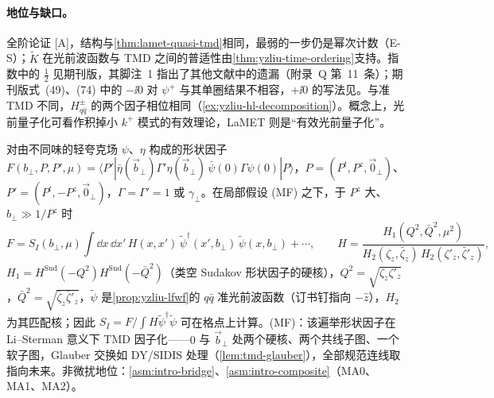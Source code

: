 \paragraph{地位与缺口。}全阶论证 [A]，结构与\cref{thm:lamet-quasi-tmd}相同，最弱的一步仍是幂次计数（E-S）；$\tilde K$ 在光前波函数与 TMD 之间的普适性由\cref{thm:yzliu-time-ordering}支持。指数中的 $\frac12$ 见期刊版\cite[式~(49)、(51)、(74)]{Ji:2021znw}，其脚注~1 指出了其他文献中的遗漏（附录~Q 第~11~条）；期刊版式~(49)、(74) 中的 $-\ii0$ 对 $\psi^+$ 与其单圈结果不相容，$+\ii0$ 的写法见\cite[式~(4.4)]{Liu:2023onm}。与准 TMD 不同，$H^\pm_{q\bar q}$ 的两个因子相位相同（\cref{ex:yzliu-hl-decomposition}）。概念上，光前量子化可看作积掉小 $k^+$ 模式的有效理论，LaMET 则是“有效光前量子化”\cite[第~II.C~节]{Ji:2021znw}。

\begin{proposition}\label{prop:yzliu-meson-ff}
对由不同味的轻夸克场 $\psi$、$\eta$ 构成的形状因子 $F(b_\perp,P,P',\mu)=\langle P'|\bar\eta(\vec b_\perp)\Gamma'\eta(\vec b_\perp)\,\bar\psi(0)\Gamma\psi(0)|P\rangle$，$P=(P^t,P^z,\vec0_\perp)$、$P'=(P^t,-P^z,\vec0_\perp)$，$\Gamma=\Gamma'=1$ 或 $\gamma_\perp$。在局部假设 (MF) 之下，于 $P^z$ 大、$b_\perp\gg1/P^z$ 时 %
\begin{equation}\label{eq:yzliu-meson-ff}
F=S_I(b_\perp,\mu)\int\dd x\,\dd x'\,H(x,x')\,\tilde\psi^\dagger(x',b_\perp)\,\tilde\psi(x,b_\perp)+\cdots,\qquad H=\frac{H_1(Q^2,\bar Q^2,\mu^2)}{H_2(\zeta_z,\bar\zeta_z)\,H_2(\zeta'_z,\bar\zeta'_z)},
\end{equation}
$H_1=H^{\mathrm{Sud}}(-Q^2)H^{\mathrm{Sud}}(-\bar Q^2)$（类空 Sudakov 形状因子的硬核），$Q^2=\sqrt{\zeta_z\zeta'_z}$，$\bar Q^2=\sqrt{\bar\zeta_z\bar\zeta'_z}$，$\tilde\psi$ 是\cref{prop:yzliu-lfwf}的 $q\bar q$ 准光前波函数（订书钉指向 $-\hat z$），$H_2$ 为其匹配核；因此 $S_I=F/\int H\tilde\psi^\dagger\tilde\psi$ 可在格点上计算。(MF)：该遍举形状因子在 Li--Sterman 意义下 TMD 因子化——$0$ 与 $\vec b_\perp$ 处两个硬核、两个共线子图、一个软子图，Glauber 交换如 DY/SIDIS 处理（\cref{lem:tmd-glauber}），全部规范连线取指向未来。非微扰地位：\cref{asm:intro-bridge}、\cref{asm:intro-composite}（MA0、MA1、MA2）。
\end{proposition}


